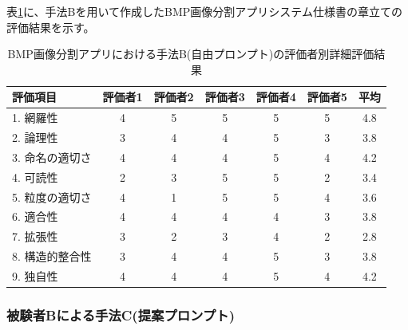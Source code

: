 表\ref{tb:detailed_evaluation_results_B}に、手法Bを用いて作成したBMP画像分割アプリシステム仕様書の章立ての評価結果を示す。

\begin{table}[tp]
  \caption{BMP画像分割アプリにおける手法B(自由プロンプト)の評価者別詳細評価結果}
  \label{tb:detailed_evaluation_results_B}
  \centering
  \begin{tabular}{|l|c|c|c|c|c|c|}
    \hline
    \textbf{評価項目} & \textbf{評価者1} & \textbf{評価者2} & \textbf{評価者3} & \textbf{評価者4} & \textbf{評価者5} & \textbf{平均} \\
    \hline\hline
    1. 網羅性 & 4 & 5 & 5 & 5 & 5 & 4.8 \\
    \hline
    2. 論理性 & 3 & 4 & 4 & 5 & 3 & 3.8 \\
    \hline
    3. 命名の適切さ & 4 & 4 & 4 & 5 & 4 & 4.2 \\
    \hline
    4. 可読性 & 2 & 3 & 5 & 5 & 2 & 3.4 \\
    \hline
    5. 粒度の適切さ & 4 & 1 & 5 & 5 & 4 & 3.6 \\
    \hline
    6. 適合性 & 4 & 4 & 4 & 4 & 3 & 3.8 \\
    \hline
    7. 拡張性 & 3 & 2 & 3 & 4 & 2 & 2.8 \\
    \hline
    8. 構造的整合性 & 3 & 4 & 4 & 5 & 3 & 3.8 \\
    \hline
    9. 独自性 & 4 & 4 & 4 & 5 & 4 & 4.2 \\
    \hline
  \end{tabular}
\end{table}



\subsubsection{被験者Bによる手法C(提案プロンプト)}

